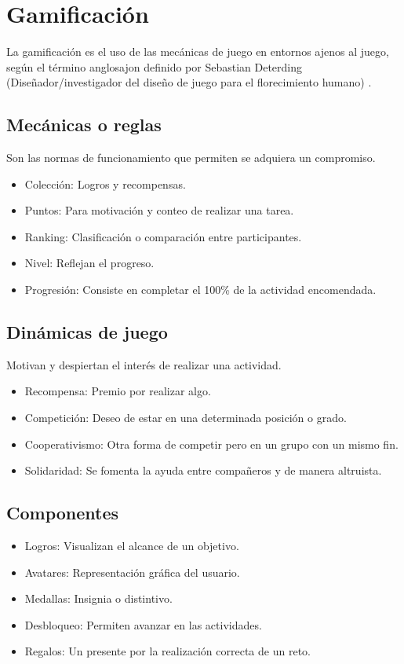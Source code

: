 \section{Gamificación}
La gamificación es el uso de las mecánicas de juego en entornos ajenos al juego, según el término anglosajon definido por Sebastian Deterding (Diseñador/investigador del diseño de juego para el florecimiento humano) \cite{gameDef}. 
\\[1pt]

\subsection{Mecánicas o reglas}\cite{gameficacion}
Son las normas de funcionamiento que permiten se adquiera un compromiso.
\\[1pt]

\begin{itemize}
	\item Colección: Logros y recompensas.
	\item Puntos: Para motivación y conteo de realizar una tarea.
	\item Ranking: Clasificación o comparación entre participantes.
	\item Nivel: Reflejan el progreso.
	\item Progresión: Consiste en completar el 100\% de la actividad encomendada.	
\end{itemize}

\subsection{Dinámicas de juego}\cite{gameficacion}
Motivan y despiertan el interés de realizar una actividad.
\\[1pt]

\begin{itemize}
	\item Recompensa: Premio por realizar algo.
	\item Competición: Deseo de estar en una determinada posición o grado.
	\item Cooperativismo: Otra forma de competir pero en un grupo con un mismo fin.
	\item Solidaridad: Se fomenta la ayuda entre compañeros y de manera altruista.
\end{itemize}

\subsection{Componentes}\cite{gameficacion}
\begin{itemize}
	\item Logros: Visualizan el alcance de un objetivo.
	\item Avatares: Representación gráfica del usuario.
	\item Medallas: Insignia o distintivo.
	\item Desbloqueo: Permiten avanzar en las actividades.
	\item Regalos: Un presente por la realización correcta de un reto.
\end{itemize}

